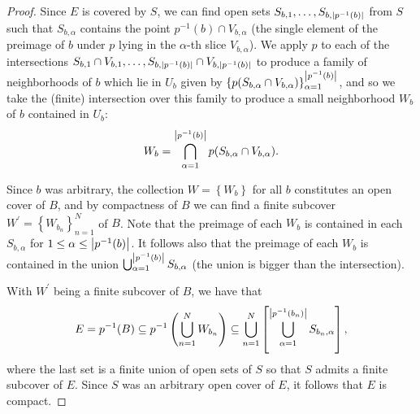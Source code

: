\documentclass[11pt]{article}
\newcommand{\br}[1]{\left(#1\right)}
\newcommand{\sbr}[1]{\left[#1\right]}
\newcommand{\cbr}[1]{\left\{#1\right\}}
\begin{document}
\begin{enumerate}
\begin{proof}
        Since $E$ is covered by $S$, we can find open sets $S_{b,1}, \dots, S_{b,\abs{p^{-1}(b)}}$ from $S$ such that $S_{b,\alpha}$ contains the point $p^{-1}(b)\cap V_{b,\alpha}$ (the single element of the preimage of $b$ under $p$ lying in the $\alpha$-th slice $V_{b,\alpha}$). We apply $p$ to each of the intersections $S_{b,1}\cap V_{b,1}, \dots, S_{b,\abs{p^{-1}(b)}}\cap V_{b,\abs{p^{-1}(b)}}$ to produce a family of neighborhoods of $b$ which lie in $U_b$ given by $\cbr{p(S_{b,\alpha}\cap V_{b,\alpha})}_{\alpha = 1}^{\abs{p^{-1}(b)}}$, and so we take the (finite) intersection over this family to produce a small neighborhood $W_b$ of $b$ contained in $U_b$: \[W_b = \bigcap_{\alpha = 1}^{\abs{p^{-1}(b)}}p(S_{b,\alpha}\cap V_{b,\alpha}).\]

        Since $b$ was arbitrary, the collection $W = \cbr{W_b}$ for all $b$ constitutes an open cover of $B$, and by compactness of $B$ we can find a finite subcover $W^{\prime} = \cbr{W_{b_n}}_{n=1}^{N}$ of $B$. Note that the preimage of each $W_b$ is contained in each $S_{b,\alpha}$ for $1\leq \alpha \leq \abs{p^{-1}(b)}$. It follows also that the preimage of each $W_b$ is contained in the union $\bigcup_{\alpha = 1}^{\abs{p^{-1}(b)}}S_{b,\alpha}$ (the union is bigger than the intersection).

        With $W^{\prime}$ being a finite subcover of $B$, we have that \begin{align*}
            E = p^{-1}(B)\subseteq p^{-1}\br{\bigcup_{n=1}^N W_{b_n}} \subseteq \bigcup_{n=1}^N \sbr{\bigcup_{\alpha = 1}^{\abs{p^{-1}(b_n)}}S_{b_n,\alpha}},
        \end{align*}
        where the last set is a finite union of open sets of $S$ so that $S$ admits a finite subcover of $E$. Since $S$ was an arbitrary open cover of $E$, it follows that $E$ is compact.
    \end{proof}
\end{enumerate}
\end{document}
